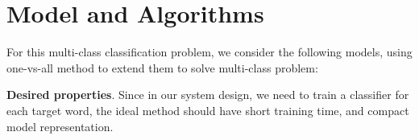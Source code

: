 \section{Model and Algorithms}

For this multi-class classification problem, we consider the following models,
using one-vs-all method to extend them to solve multi-class problem:








\textbf{Desired properties}. Since in our system design, we need to train a
classifier for each target word, the ideal method should have short training
time, and compact model representation.

